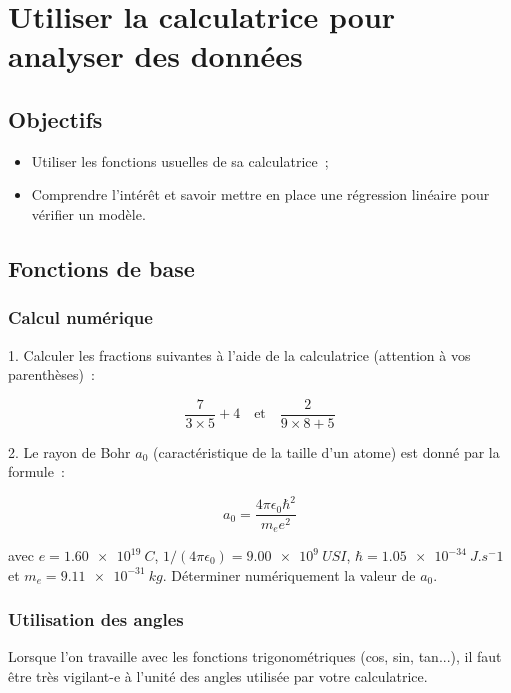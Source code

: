 \documentclass[a4paper, 12pt, final, garamond]{book}
\begin{document}
\setcounter{chapter}{-1}

\chapter{Utiliser la calculatrice pour analyser des donn\'ees}

\section{Objectifs}

\begin{itemize}
    \item Utiliser les fonctions usuelles de sa calculatrice~;
    \item Comprendre l'intérêt et savoir mettre en place une régression linéaire
        pour vérifier un modèle.
\end{itemize}

\section{Fonctions de base}

\subsection{Calcul num\'erique}

1. Calculer les fractions suivantes à l'aide de la calculatrice (attention à vos
parenthèses)~: 

\[\frac{7}{3\times 5}+4 \quad\text{et}\quad \frac{2}{9\times8 + 5}\]

\vspace{2cm}

2. Le rayon de Bohr $a_0$ (caractéristique de la taille d'un atome) est donné
par la formule~: 

\[a_0 = \frac{4\pi \epsilon_0 \hbar^2}{m_ee^2}\] 

avec $e = \SI{1,60e19}{C}$, $1/(4\pi\epsilon_0) = \SI{9,00e9}{USI}$,
$\hbar = \SI{1.05e-34}{J.s{^-1}}$ et $m_e = \SI{9,11e-31}{kg}$. Déterminer
numériquement la valeur de $a_0$.

\vspace{2cm}

\subsection{Utilisation des angles}

Lorsque l'on travaille avec les fonctions trigonométriques (cos, sin, tan...),
il faut être très vigilant-e à l'unité des angles utilisée par votre
calculatrice. 
\end{document}

